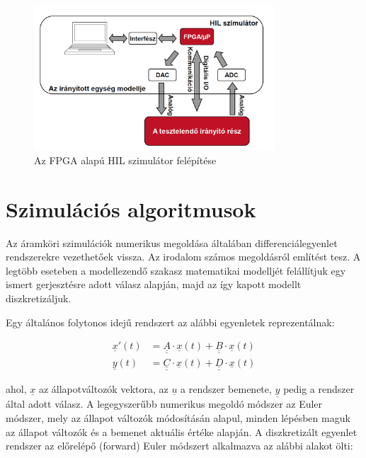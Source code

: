 \begin{figure}[h]
	\centering
	\includegraphics[width = 0.8\textwidth]{figures/hil_idea.png}
	\caption{Az FPGA alapú HIL szimulátor felépítése \cite{kokippt}} 
	\label{fig:hil_idea}
\end{figure}


\section{Szimulációs algoritmusok\cite{koki_varjasi}}

Az áramköri szimulációk numerikus megoldása általában differenciálegyenlet rendszerekre vezethetőek vissza. Az irodalom számos megoldásról említést tesz. A legtöbb eseteben a modellezendő szakasz matematikai modelljét felállítjuk egy ismert gerjesztésre adott válasz alapján, majd az így kapott modellt diszkretizáljuk.

Egy általános folytonos idejű rendszert az alábbi egyenletek reprezentálnak: 

\begin{equation}
\begin{align*}
\underline{x}'(t) &= \underline{\underline{A}}\cdot \underline{x}(t) + \underline{\underline{B}}\cdot{}\underline{x}(t) \\[0.3em]
\underline{y}(t) &= \underline{\underline{C}}\cdot \underline{x}(t) + \underline{\underline{D}}\cdot{}\underline{x}(t)
\end{align*} 
\end{equation}

ahol, $\underline{x}$ az állapotváltozók vektora, az $\underline{u}$ a rendszer bemenete, $\underline{y}$ pedig a rendszer által adott válasz.
A legegyszerűbb numerikus megoldó módszer az Euler módszer, mely az állapot változók módosításán alapul, minden lépésben maguk az állapot változók és a bemenet aktuális értéke alapján. A diszkretizált egyenlet rendszer az előrelépő (forward) Euler módszert alkalmazva az alábbi alakot ölti:

